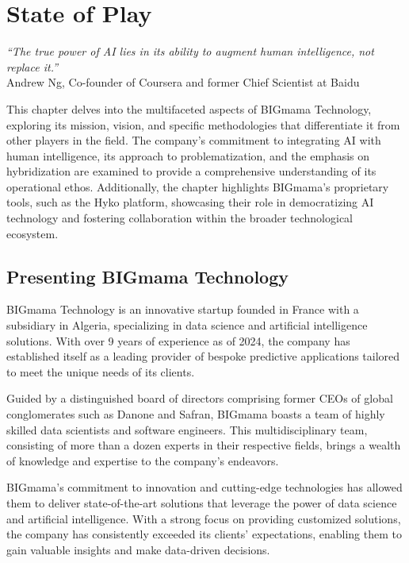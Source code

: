 \chapter{State of Play}
\graphicspath{{state-of-play/figures/}}

\begin{flushright}
    \small{\textit{``The true power of AI lies in its ability to augment human intelligence, not replace it.''}\\
        Andrew Ng, Co-founder of Coursera and former Chief Scientist at Baidu}
\end{flushright}

This chapter delves into the multifaceted aspects of BIGmama Technology, exploring its mission, vision, and specific methodologies that differentiate it from other players in the field. The company's commitment to integrating AI with human intelligence, its approach to problematization, and the emphasis on hybridization are examined to provide a comprehensive understanding of its operational ethos. Additionally, the chapter highlights BIGmama's proprietary tools, such as the Hyko platform, showcasing their role in democratizing AI technology and fostering collaboration within the broader technological ecosystem.

\section{Presenting BIGmama Technology}

BIGmama Technology is an innovative startup founded in France with a subsidiary in Algeria, specializing in data science and artificial intelligence solutions. With over 9 years of experience as of 2024, the company has established itself as a leading provider of bespoke predictive applications tailored to meet the unique needs of its clients.

Guided by a distinguished board of directors comprising former CEOs of global conglomerates such as Danone and Safran, BIGmama boasts a team of highly skilled data scientists and software engineers. This multidisciplinary team, consisting of more than a dozen experts in their respective fields, brings a wealth of knowledge and expertise to the company's endeavors.

BIGmama's commitment to innovation and cutting-edge technologies has allowed them to deliver state-of-the-art solutions that leverage the power of data science and artificial intelligence. With a strong focus on providing customized solutions, the company has consistently exceeded its clients' expectations, enabling them to gain valuable insights and make data-driven decisions.

